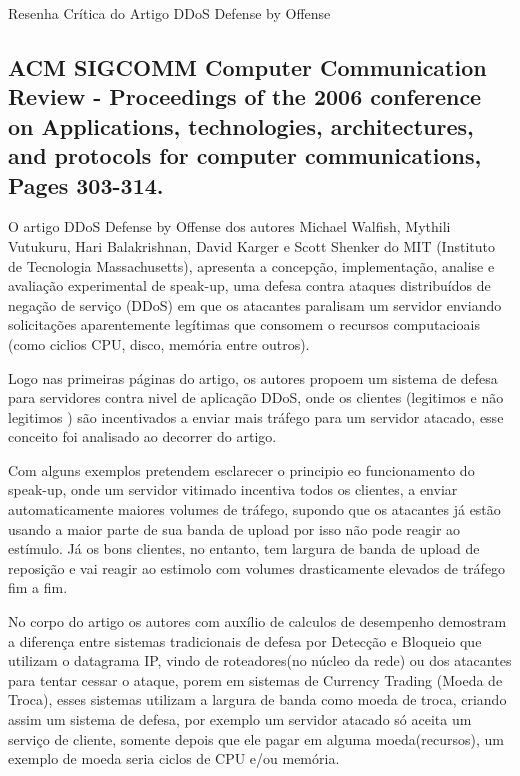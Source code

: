 \documentclass[a4paper,12pt]{article}
\begin{document}
\LARGE
Resenha Crítica do Artigo DDoS Defense by Offense
\large

\subsection*{\textbf{ACM SIGCOMM } Computer Communication Review - Proceedings of the 2006 conference on Applications, technologies, architectures, and protocols for computer communications, Pages 303-314.}
\vspace{0.3cm}


O artigo DDoS Defense by Offense \cite{Walfish:2006:DDO:1151659.1159948} dos autores Michael Walfish, Mythili Vutukuru, Hari Balakrishnan, David Karger  e  Scott Shenker do MIT (Instituto de Tecnologia Massachusetts), apresenta a concepção, implementação, analise e avaliação experimental de speak-up, uma defesa contra ataques distribuídos de negação de serviço (DDoS) em que os atacantes paralisam um servidor enviando solicitações aparentemente legítimas que consomem o recursos computacioais (como ciclios CPU, disco, memória entre outros).


\vspace{0.3cm}

 Logo nas primeiras páginas do artigo, os autores propoem um sistema de defesa para servidores contra nivel de aplicação DDoS, onde os clientes (legitimos e não legitimos ) são incentivados a enviar mais tráfego para um servidor atacado, esse conceito foi analisado ao decorrer do artigo.

\vspace{0.3cm}
Com alguns exemplos pretendem esclarecer o principio eo funcionamento do speak-up, onde um servidor vitimado incentiva todos os clientes, a enviar automaticamente maiores volumes de tráfego, supondo que os atacantes já estão usando a maior parte de sua banda de upload por isso não pode reagir ao estímulo. Já os bons clientes, no entanto, tem largura de banda de upload de reposição e vai reagir ao estimolo com volumes drasticamente elevados de tráfego fim a fim.

\vspace{0.3cm}

No corpo do artigo os autores com auxílio de calculos de desempenho demostram  a diferença entre sistemas tradicionais de defesa por Detecção e Bloqueio que utilizam o datagrama IP, vindo de roteadores(no núcleo da rede) ou dos atacantes para tentar cessar o ataque, porem em sistemas de Currency Trading (Moeda de Troca), esses sistemas utilizam a largura de banda como moeda de troca, criando assim um sistema de defesa, por exemplo um servidor atacado só aceita um serviço de cliente, somente depois que ele pagar em alguma moeda(recursos), um exemplo de moeda seria ciclos de CPU e/ou memória. 
\end{document}
